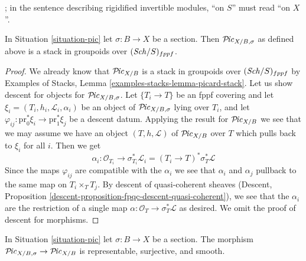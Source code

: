 \begin{lemma}
\label{lemma-pic-with-section-stack}
\begin{reference}
\cite[Expos\'e 232, Remark 2.5, p. 147]{FGA}; in the sentence describing
rigidified invertible modules, ``on $S$'' must read ``on $X$''.
\end{reference}
In Situation \ref{situation-pic} let $\sigma : B \to X$ be a section.
Then $\mathcal{P}\!\mathit{ic}_{X/B, \sigma}$ as defined above is a stack in
groupoids over $(\mathit{Sch}/S)_{fppf}$.
\end{lemma}

\begin{proof}
We already know that $\mathcal{P}\!\mathit{ic}_{X/B}$ is a stack in groupoids
over $(\mathit{Sch}/S)_{fppf}$ by
Examples of Stacks, Lemma \ref{examples-stacks-lemma-picard-stack}.
Let us show descent for objects for $\mathcal{P}\!\mathit{ic}_{X/B, \sigma}$.
Let $\{T_i \to T\}$ be an fppf covering and let
$\xi_i = (T_i, h_i, \mathcal{L}_i, \alpha_i)$ be an object of
$\mathcal{P}\!\mathit{ic}_{X/B, \sigma}$ lying over $T_i$, and let
$\varphi_{ij} : \text{pr}_0^*\xi_i \to \text{pr}_1^*\xi_j$
be a descent datum. Applying the result for $\mathcal{P}\!\mathit{ic}_{X/B}$
we see that we may assume we have an object $(T, h, \mathcal{L})$
of $\mathcal{P}\!\mathit{ic}_{X/B}$ over $T$ which pulls back to $\xi_i$ for all $i$.
Then we get
$$
\alpha_i : \mathcal{O}_{T_i} \to \sigma_{T_i}^*\mathcal{L}_i =
(T_i \to T)^*\sigma_T^*\mathcal{L}
$$
Since the maps $\varphi_{ij}$ are compatible with the $\alpha_i$
we see that $\alpha_i$ and $\alpha_j$ pullback to the same map
on $T_i \times_T T_j$. By descent of quasi-coherent sheaves
(Descent, Proposition \ref{descent-proposition-fpqc-descent-quasi-coherent}),
we see that the $\alpha_i$ are the restriction of a single map
$\alpha : \mathcal{O}_T \to \sigma_T^*\mathcal{L}$ as desired.
We omit the proof of descent for morphisms.
\end{proof}

\begin{lemma}
\label{lemma-compare-pic-with-section}
In Situation \ref{situation-pic} let $\sigma : B \to X$ be a section.
The morphism $\mathcal{P}\!\mathit{ic}_{X/B, \sigma} \to \mathcal{P}\!\mathit{ic}_{X/B}$
is representable, surjective, and smooth.
\end{lemma}

